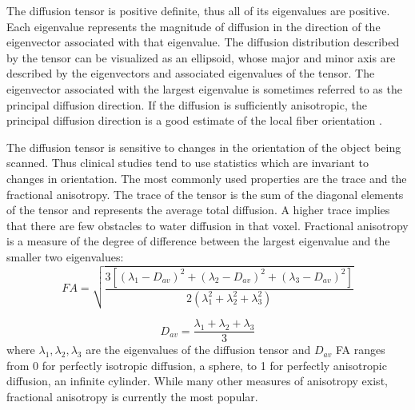 The diffusion tensor is positive definite, thus all of its eigenvalues are positive.  Each eigenvalue represents the magnitude of diffusion in the direction of the eigenvector associated with that eigenvalue.  The diffusion distribution described by the tensor can be visualized as an ellipsoid, whose major and minor axis are described by the eigenvectors and associated eigenvalues of the tensor.  The eigenvector associated with the largest eigenvalue is sometimes referred to as the principal diffusion direction.  If the diffusion is sufficiently anisotropic, the principal diffusion direction is a good estimate of the local fiber orientation \cite{Lin01}. %

The diffusion tensor is sensitive to changes in the orientation of the object being scanned. Thus clinical studies tend to use statistics which are invariant to changes in orientation.  The most commonly used properties are the trace and the fractional anisotropy.  The trace of the tensor is the sum of the diagonal elements of the tensor and represents the average total diffusion.  A higher trace implies that there are few obstacles to water diffusion in that voxel.  Fractional anisotropy is a measure of the degree of difference between the largest eigenvalue and the smaller two eigenvalues:
\begin{equation}
FA=\sqrt{\frac{3[(\lambda_1-D_{av})^2 + (\lambda_2-D_{av})^2 + (\lambda_3-D_{av})^2]}
{2(\lambda_1^2+\lambda_2^2+\lambda_3^2)}}
\end{equation}

\begin{equation}
D_{av}=\frac{\lambda_1+\lambda_2+\lambda_3}{3}
\end{equation}
where $\lambda_1,\lambda_2,\lambda_3$ are the eigenvalues of the diffusion tensor and $D_{av}$
FA ranges from 0 for perfectly isotropic diffusion, a sphere, to 1 for perfectly anisotropic diffusion, an infinite cylinder.  While many other measures of anisotropy exist, fractional anisotropy is currently the most popular.





